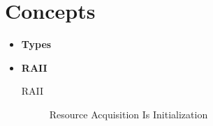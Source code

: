 \documentclass{article}
\begin{document}
\section{Concepts}
    \begin{itemize}
      \item \textbf{Types}
      \item \textbf{RAII}
        \begin{description}
          \item[RAII]
            Resource Acquisition Is Initialization
        \end{description}
    \end{itemize}
\end{document}
